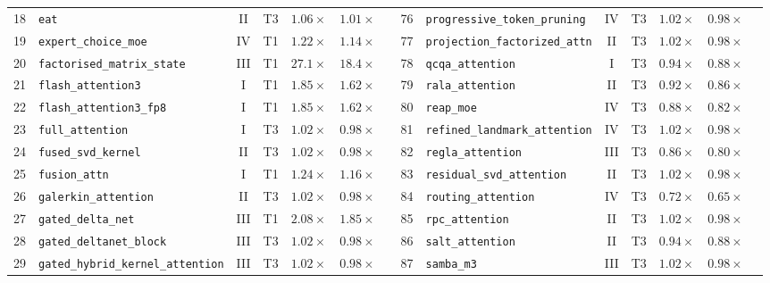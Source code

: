 \begin{table}[p]
{\begin{tabular}{r l c c c c l | r l c c c c l}
18 & \texttt{eat} & II & T3 & $1.06\times$ & $1.01\times$ & \passfast{} & 76 & \texttt{progressive\_token\_pruning} & IV & T3 & $1.02\times$ & $0.98\times$ & \passslow{} \\
19 & \texttt{expert\_choice\_moe} & IV & T1 & $1.22\times$ & $1.14\times$ & \passfast{} & 77 & \texttt{projection\_factorized\_attn} & II & T3 & $1.02\times$ & $0.98\times$ & \passslow{} \\
20 & \texttt{factorised\_matrix\_state} & III & T1 & $27.1\times$ & $18.4\times$ & \passfast{} & 78 & \texttt{qcqa\_attention} & I & T3 & $0.94\times$ & $0.88\times$ & \passslow{} \\
21 & \texttt{flash\_attention3} & I & T1 & $1.85\times$ & $1.62\times$ & \passfast{} & 79 & \texttt{rala\_attention} & II & T3 & $0.92\times$ & $0.86\times$ & \passslow{} \\
22 & \texttt{flash\_attention3\_fp8} & I & T1 & $1.85\times$ & $1.62\times$ & \passfast{} & 80 & \texttt{reap\_moe} & IV & T3 & $0.88\times$ & $0.82\times$ & \passslow{} \\
23 & \texttt{full\_attention} & I & T3 & $1.02\times$ & $0.98\times$ & \passslow{} & 81 & \texttt{refined\_landmark\_attention} & IV & T3 & $1.02\times$ & $0.98\times$ & \passslow{} \\
24 & \texttt{fused\_svd\_kernel} & II & T3 & $1.02\times$ & $0.98\times$ & \passslow{} & 82 & \texttt{regla\_attention} & III & T3 & $0.86\times$ & $0.80\times$ & \passslow{} \\
25 & \texttt{fusion\_attn} & I & T1 & $1.24\times$ & $1.16\times$ & \passfast{} & 83 & \texttt{residual\_svd\_attention} & II & T3 & $1.02\times$ & $0.98\times$ & \passslow{} \\
26 & \texttt{galerkin\_attention} & II & T3 & $1.02\times$ & $0.98\times$ & \passslow{} & 84 & \texttt{routing\_attention} & IV & T3 & $0.72\times$ & $0.65\times$ & \passslow{} \\
27 & \texttt{gated\_delta\_net} & III & T1 & $2.08\times$ & $1.85\times$ & \passfast{} & 85 & \texttt{rpc\_attention} & II & T3 & $1.02\times$ & $0.98\times$ & \passslow{} \\
28 & \texttt{gated\_deltanet\_block} & III & T3 & $1.02\times$ & $0.98\times$ & \passslow{} & 86 & \texttt{salt\_attention} & II & T3 & $0.94\times$ & $0.88\times$ & \passslow{} \\
29 & \texttt{gated\_hybrid\_kernel\_attention} & III & T3 & $1.02\times$ & $0.98\times$ & \passslow{} & 87 & \texttt{samba\_m3} & III & T3 & $1.02\times$ & $0.98\times$ & \passslow{} \\

\end{tabular}}
\end{table}
